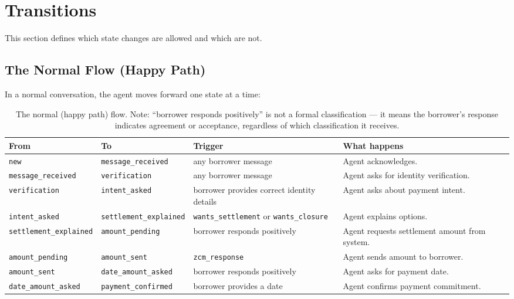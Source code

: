 \documentclass[11pt, a4paper]{article}
\begin{document}
\section{Transitions}
\label{sec:transitions}

This section defines which state changes are allowed and which are not.

\subsection{The Normal Flow (Happy Path)}

In a normal conversation, the agent moves forward one state at a time:

\begin{table}[h]
\centering
\small
\begin{tabular}{llp{3cm}p{4.5cm}}
\toprule
\textbf{From} & \textbf{To} & \textbf{Trigger} & \textbf{What happens} \\
\midrule
\texttt{new} & \texttt{message\_received} & any borrower message & Agent acknowledges. \\
\texttt{message\_received} & \texttt{verification} & any borrower message & Agent asks for identity verification. \\
\texttt{verification} & \texttt{intent\_asked} & borrower provides correct identity details & Agent asks about payment intent. \\
\texttt{intent\_asked} & \texttt{settlement\_explained} & \texttt{wants\_settlement} or \texttt{wants\_closure} & Agent explains options. \\
\texttt{settlement\_explained} & \texttt{amount\_pending} & borrower responds positively & Agent requests settlement amount from system. \\
\texttt{amount\_pending} & \texttt{amount\_sent} & \texttt{zcm\_response} & Agent sends amount to borrower. \\
\texttt{amount\_sent} & \texttt{date\_amount\_asked} & borrower responds positively & Agent asks for payment date. \\
\texttt{date\_amount\_asked} & \texttt{payment\_confirmed} & borrower provides a date & Agent confirms payment commitment. \\
\bottomrule
\end{tabular}
\caption{The normal (happy path) flow. Note: ``borrower responds positively'' is not a formal classification --- it means the borrower's response indicates agreement or acceptance, regardless of which classification it receives.}
\end{table}
\end{document}
